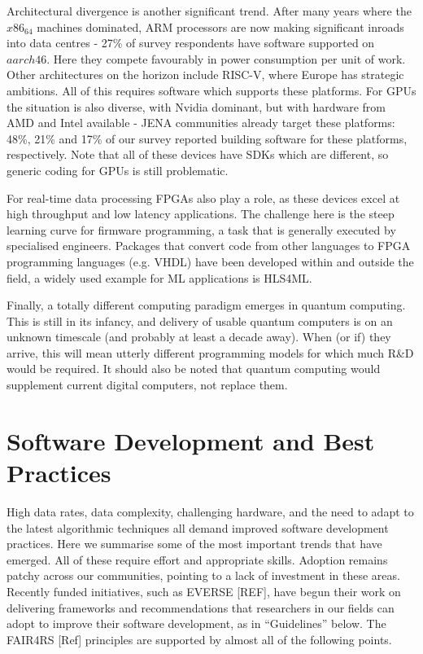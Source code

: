 Architectural divergence is another significant trend. After many years where the $x86_64$ machines dominated, ARM processors are now making significant inroads into data centres - 27\% of survey respondents have software supported on $aarch46$. Here they compete favourably in power consumption per unit of work. Other architectures on the horizon include RISC-V, where Europe has strategic ambitions. All of this requires software which supports these platforms. For GPUs the situation is also diverse, with Nvidia dominant, but with hardware from AMD and Intel available - JENA communities already target these platforms: 48\%, 21\% and 17\% of our survey reported building software for these platforms, respectively. Note that all of these devices have SDKs which are different, so generic coding for GPUs is still problematic. 

For real-time data processing FPGAs also play a role, as these devices excel at high throughput and low latency applications. The challenge here is the steep learning curve for firmware programming, a task that is generally executed by specialised engineers. Packages that convert code from other languages to FPGA programming languages (e.g. VHDL) have been developed within and outside the field, a widely used example for ML applications is HLS4ML.

Finally, a totally different computing paradigm emerges in quantum computing. This is still in its infancy, and delivery of usable quantum computers is on an unknown timescale (and probably at least a decade away). When (or if) they arrive, this will mean utterly different programming models for which much R\&D would be required. It should also be noted that quantum computing would supplement current digital computers, not replace them.


\section{Software Development and Best Practices}

High data rates, data complexity, challenging hardware, and the need to adapt to the latest algorithmic techniques all demand improved software development practices. Here we summarise some of the most important trends that have emerged. All of these require effort and appropriate skills. Adoption remains patchy across our communities, pointing to a lack of investment in these areas. Recently funded initiatives, such as EVERSE [REF], have begun their work on delivering frameworks and recommendations that researchers in our fields can adopt to improve their software development, as in “Guidelines” below. The FAIR4RS [Ref] principles are supported by almost all of the following points.

